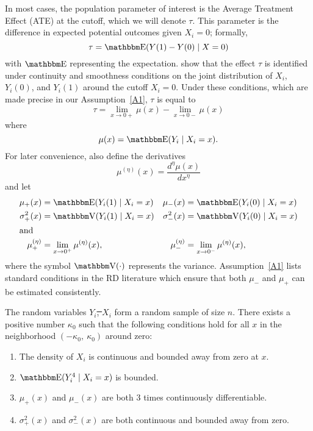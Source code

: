 \documentclass[12pt,fleqn]{article}
\providecommand{\DIFadd}[1]{{\protect\color{blue}\uwave{#1}}} %
\providecommand{\DIFdel}[1]{{\protect\color{red}\sout{#1}}}                      %
\providecommand{\DIFaddbegin}{} %
\providecommand{\DIFaddend}{} %
\providecommand{\DIFdelbegin}{} %
\providecommand{\DIFdelend}{} %
\begin{document}
In most cases, the population parameter of interest is the Average Treatment
Effect (ATE) at the cutoff, which we will denote $\tau$. This parameter is the
difference in expected potential outcomes given $X_i = 0$; formally,
\begin{equation*}
  \tau=\E(Y(1)-Y(0) \mid X=0)
\end{equation*}
with $\E$ representing the expectation.
\cite{HTV2001} show that the effect $\tau$ is identified under continuity and
smoothness conditions on the joint distribution of $X_i$, $Y_i(0)$, and $Y_i(1)$
around the cutoff $X_i = 0$. Under these conditions, which are made precise
in our Assumption~\ref{A1}, $\tau$ is equal to
\begin{equation*}
  \tau = \lim_{x \to 0+} \mu(x) - \lim_{x \to 0-} \mu(x)
\end{equation*}
where
\begin{equation*}
  \mu(x)= \E(Y_{i} \mid X_{i}=x).
\end{equation*}
For later convenience, also define the derivatives
\begin{equation*}
  \mu^{(\eta)}(x)=\frac{d^{\eta}\mu(x)}{dx^{\eta}}
\end{equation*}
and let
\begin{align*}
  \mu_{+}(x)
  &= \E( Y_{i}(1) \mid X_{i}=x )
  &\mu_{-}(x)
  &= \E( Y_{i}(0) \mid X_{i}=x ) \\
  \sigma^{2}_{+}(x) &= \V( Y_{i}(1) \mid X_{i}=x )
  &\sigma^{2}_{-}(x)&=\V( Y_{i}(0) \mid X_{i}=x ) \\
\intertext{and}
  \mu^{(\eta)}_{+}
  &= \lim_{x \rightarrow 0^{+}}\mu^{(\eta)}(x),
  &\mu^{(\eta)}_{-}
  &= \lim_{x \rightarrow 0^{-}}\mu^{(\eta)}(x),
\end{align*}
where the symbol $\V(\cdot)$ represents the variance. Assumption~\ref{A1} lists
standard conditions in the RD literature which ensure that both $\mu_-$ and
$\mu_+$ can be estimated consistently.

\begin{assumption}\label{A1}
  The random variables \DIFdelbegin \DIFdel{$Y_i$, $X_i$ }\DIFdelend \DIFaddbegin \DIFadd{$\{Y_i, X_i\}_{i=1}^n$ }\DIFaddend form a random sample of size $n$.
  There exists a positive number $\kappa_0$ such that the following
  conditions hold for all $x$ in the neighborhood $(-\kappa_{0},\ \kappa_{0})$
  around zero:
  \begin{enumerate}
  \item The density of $X_i$ is continuous and bounded away from zero at $x$.
  \item $\E(Y_{i}^{4} \mid X_{i}=x)$ is bounded.
  \item $\mu_+(x)$ and $\mu_-(x)$ are both 3 times continuously differentiable.
  \item $\sigma_+^2(x)$ and $\sigma_-^2(x)$ are both continuous and bounded away
    from zero.
 \end{enumerate}
\end{assumption}
\end{document}
